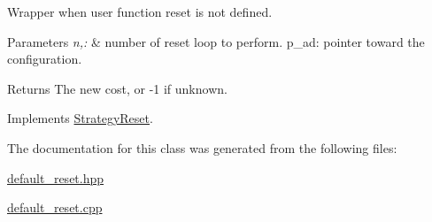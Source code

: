 \-Wrapper when user function reset is not defined. 


\begin{DoxyParams}{\-Parameters}
{\em n,\-:} & number of reset loop to perform. p\-\_\-ad\-: pointer toward the configuration. \\
\hline
\end{DoxyParams}
\begin{DoxyReturn}{\-Returns}
\-The new cost, or -\/1 if unknown. 
\end{DoxyReturn}


\-Implements \hyperlink{classStrategyReset_af6cedf730c45825c61390455bd6f90a4}{\-Strategy\-Reset}.



\-The documentation for this class was generated from the following files\-:\begin{DoxyCompactItemize}
\item 
\hyperlink{default__reset_8hpp}{default\-\_\-reset.\-hpp}\item 
\hyperlink{default__reset_8cpp}{default\-\_\-reset.\-cpp}\end{DoxyCompactItemize}
